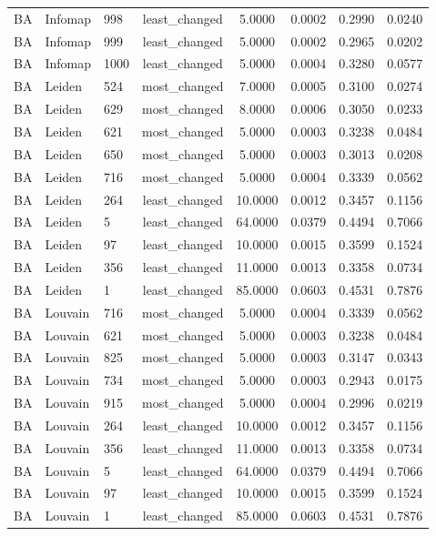 \begin{longtable}{lllccccc}
BA & Infomap & 998 & least\_changed & 5.0000 & 0.0002 & 0.2990 & 0.0240 \\
BA & Infomap & 999 & least\_changed & 5.0000 & 0.0002 & 0.2965 & 0.0202 \\
BA & Infomap & 1000 & least\_changed & 5.0000 & 0.0004 & 0.3280 & 0.0577 \\
BA & Leiden & 524 & most\_changed & 7.0000 & 0.0005 & 0.3100 & 0.0274 \\
BA & Leiden & 629 & most\_changed & 8.0000 & 0.0006 & 0.3050 & 0.0233 \\
BA & Leiden & 621 & most\_changed & 5.0000 & 0.0003 & 0.3238 & 0.0484 \\
BA & Leiden & 650 & most\_changed & 5.0000 & 0.0003 & 0.3013 & 0.0208 \\
BA & Leiden & 716 & most\_changed & 5.0000 & 0.0004 & 0.3339 & 0.0562 \\
BA & Leiden & 264 & least\_changed & 10.0000 & 0.0012 & 0.3457 & 0.1156 \\
BA & Leiden & 5 & least\_changed & 64.0000 & 0.0379 & 0.4494 & 0.7066 \\
BA & Leiden & 97 & least\_changed & 10.0000 & 0.0015 & 0.3599 & 0.1524 \\
BA & Leiden & 356 & least\_changed & 11.0000 & 0.0013 & 0.3358 & 0.0734 \\
BA & Leiden & 1 & least\_changed & 85.0000 & 0.0603 & 0.4531 & 0.7876 \\
BA & Louvain & 716 & most\_changed & 5.0000 & 0.0004 & 0.3339 & 0.0562 \\
BA & Louvain & 621 & most\_changed & 5.0000 & 0.0003 & 0.3238 & 0.0484 \\
BA & Louvain & 825 & most\_changed & 5.0000 & 0.0003 & 0.3147 & 0.0343 \\
BA & Louvain & 734 & most\_changed & 5.0000 & 0.0003 & 0.2943 & 0.0175 \\
BA & Louvain & 915 & most\_changed & 5.0000 & 0.0004 & 0.2996 & 0.0219 \\
BA & Louvain & 264 & least\_changed & 10.0000 & 0.0012 & 0.3457 & 0.1156 \\
BA & Louvain & 356 & least\_changed & 11.0000 & 0.0013 & 0.3358 & 0.0734 \\
BA & Louvain & 5 & least\_changed & 64.0000 & 0.0379 & 0.4494 & 0.7066 \\
BA & Louvain & 97 & least\_changed & 10.0000 & 0.0015 & 0.3599 & 0.1524 \\
BA & Louvain & 1 & least\_changed & 85.0000 & 0.0603 & 0.4531 & 0.7876 \\

\end{longtable}

